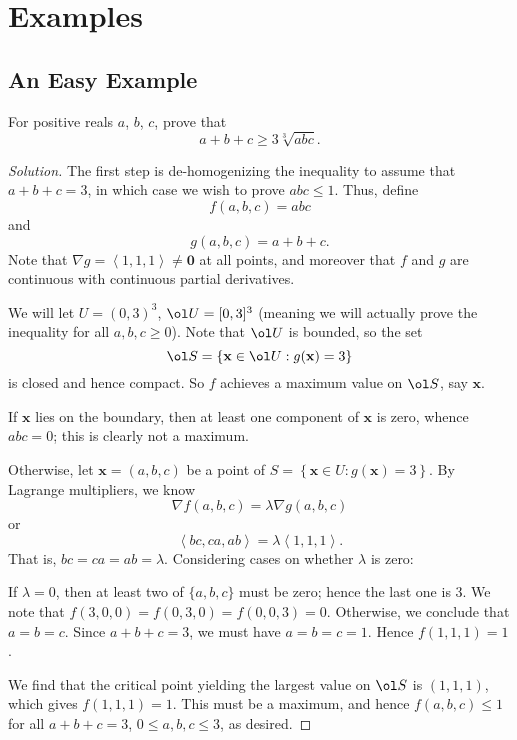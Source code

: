 \documentclass[11pt]{scrartcl}
\begin{document}
\section{Examples}
\subsection{An Easy Example}
\begin{example}
  [AM-GM] For positive reals $a$, $b$, $c$, prove that
  \[ a+b+c \ge 3\sqrt[3]{abc}. \]
\end{example}
\begin{proof}[Solution]
  The first step is de-homogenizing the inequality
  to assume that $a+b+c=3$,
  in which case we wish to prove $abc \le 1$.
  Thus, define
  \[ f(a,b,c) = abc \]
  and
  \[ g(a,b,c) = a+b+c. \]
  Note that $\nabla g = \left<1,1,1\right> \neq \mathbf{0}$
  at all points, and moreover that $f$ and $g$ are continuous
  with continuous partial derivatives.

  We will let $U = (0,3)^3$, $\ol U = [0,3]^3$
  (meaning we will actually prove the inequality
  for all $a,b,c \ge 0$).
  Note that $\ol U$ is bounded, so the set
  \[ \ol S = \left\{ \mathbf{x} \in \ol U : g(\mathbf{x}) = 3 \right\} \]
  is closed and hence compact.
  So $f$ achieves a maximum value on $\ol S$, say $\mathbf{x}$.

  If $\mathbf{x}$ lies on the boundary,
  then at least one component of $\mathbf{x}$ is zero,
  whence $abc = 0$; this is clearly not a maximum.

  Otherwise, let $\mathbf{x} = (a,b,c)$ be a point of
  $S = \left\{ \mathbf{x} \in U : g(\mathbf{x}) = 3 \right\}$.
  By Lagrange multipliers, we know
  \[ \nabla f(a,b,c) = \lambda \nabla g(a,b,c) \]
  or
  \[ \left< bc, ca, ab \right> = \lambda \left<1,1,1\right>. \]
  That is, $bc = ca = ab = \lambda$.
  Considering cases on whether $\lambda$ is zero:
  \begin{itemize}
    \ii If $\lambda = 0$, then at least two of $\{a,b,c\}$ must be zero; hence the last one is $3$.
    We note that $f(3,0,0) = f(0,3,0) = f(0,0,3) = 0$.
    \ii Otherwise, we conclude that $a=b=c$.
    Since $a+b+c=3$, we must have $a=b=c=1$.
    Hence $f(1,1,1) = 1$.
  \end{itemize}

  We find that the critical point yielding the largest value
  on $\ol S$ is $(1,1,1)$, which gives $f(1,1,1) = 1$.
  This must be a maximum, and hence $f(a,b,c) \le 1$
  for all $a+b+c=3$, $0 \le a,b,c \le 3$, as desired.
\end{proof}
\end{document}

